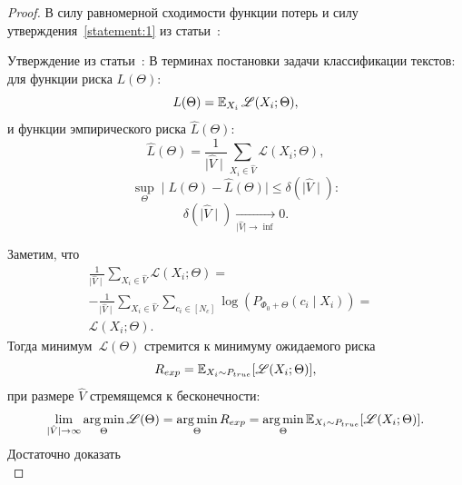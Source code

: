 \begin{proof}
В силу равномерной сходимости функции потерь и силу утверждения~\ref{statement:1} из статьи~\cite{donini2018empirical}:
\begin{lemma}
\label{statement:1}
Утверждение из статьи~\cite{donini2018empirical}:
В терминах постановки задачи классификации текстов:
для функции риска $L(\Theta)$:
\begin{equation}
\label{eq:2.3}
L(\Theta) = \operatorname{\mathbb{E}} _{X_i} \mathscr{L}(X_i; \Theta),
\end{equation}
и функции эмпирического риска $\hat{L}(\Theta)$:
\begin{equation}
\hat{L}(\Theta) = \frac{1}{\mid \hat{V} \mid} \sum_{X_i \in \hat{V}} \mathscr{L}(X_i; \Theta), 
\end{equation}
\begin{equation}
\sup _{\Theta} \mid L(\Theta) - \hat{L}(\Theta) \mid \le \delta(\mid \hat{V} \mid):
\end{equation}
\begin{equation}
\delta(\mid \hat{V} \mid) \xrightarrow[\mid \hat{V} \mid \rightarrow \inf]{} 0.
\end{equation}
\end{lemma}
Заметим, что 
\begin{equation}
\begin{aligned}
    \frac{1}{\mid \hat{V} \mid} \sum_{X_i \in \hat{V}} \mathscr{L}(X_i; \Theta) =&\\  - \frac{1}{\mid \hat{V} \mid} \sum_{X_i \in \hat{V}} \sum_{c_i \in [N_c]} \log \left(P_{\Phi_0+\Theta}\left(c_i \mid X_i\right)\right) =&\\ \mathscr{L}(X_i; \Theta).
\end{aligned}
\end{equation}
Тогда минимум~$\mathscr{L}(\Theta)$ стремится к минимуму ожидаемого риска~\begin{equation}
    R_{exp}=\operatorname{\mathbb{E}} _{X_i \sim P_{true}} [\mathscr{L}(X_i; \Theta)],
\end{equation}при размере $\hat{V}$ стремящемся к бесконечности:
\begin{equation}
\label{eq:3.1}
\begin{aligned}
\lim_{\mid\hat{V}\mid\to\infty}  \operatorname*{arg\,min} _\Theta \mathscr{L}(\Theta)  = \operatorname*{arg\,min} _\Theta R_{exp} = \operatorname*{arg\,min} _\Theta \operatorname{\mathbb{E}} _{X_i \sim P_{true}} [\mathscr{L}(X_i; \Theta)].
\end{aligned}
\end{equation}
Достаточно доказать 
\begin{equation}

\end{equation}
\end{proof}
